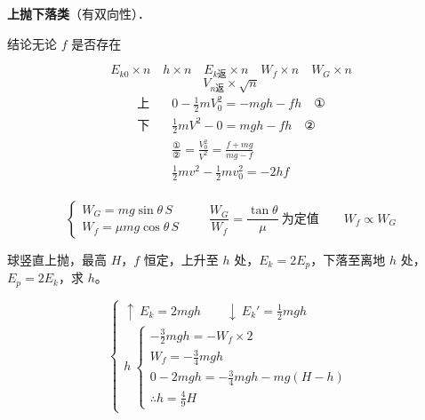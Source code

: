 \textbf{上抛下落类}\quad （有双向性）．
\begin{keybox}
结论\quad 无论 $f$ 是否存在
\end{keybox}
\[
E_{k0}\times n\quad h\times n\quad E_{k\text{返}}\times n\quad W_f\times n\quad W_G\times n
\]
\[
V_{n\text{返}}\times\sqrt{n}
\]
\begin{align*}
\text{上}\quad & 0-\tfrac12 mV_0^2=-mgh-fh \quad\text{①}\\
\text{下}\quad & \tfrac12 mV^2-0=mgh-fh \quad\text{②}\\
& \frac{\text{①}}{\text{②}}=\frac{V_0^2}{V^2}=\frac{f+mg}{mg-f}\\
& \tfrac12 mv^2-\tfrac12 mv_0^2=-2hf
\end{align*}
\\
\[
\begin{cases}
W_G = mg\sin\theta\,S\\
W_f = \mu mg\cos\theta\,S
\end{cases}
\qquad
\frac{W_G}{W_f}=\frac{\tan\theta}{\mu}\ \text{为定值}
\qquad
W_f\propto W_G
\]
\begin{problem}
球竖直上抛，最高 $H$，$f$ 恒定，上升至 $h$ 处，$E_k=2E_p$，下落至离地 $h$ 处，$E_p=2E_k$，求 $h$。
\begin{solution}
\[
\left\{
\begin{array}{l}
\uparrow\ E_k=2mgh\qquad \downarrow\ E_k'=\tfrac12 mgh\\[6pt]
h\ \left\{
\begin{array}{l}
-\tfrac32 mgh=-W_f\times 2\\
W_f=-\tfrac34 mgh\\
0-2mgh=-\tfrac34 mgh-mg(H-h)\\
\therefore h=\tfrac49 H
\end{array}
\right.
\end{array}
\right.
\]
\end{solution}
\end{problem}
